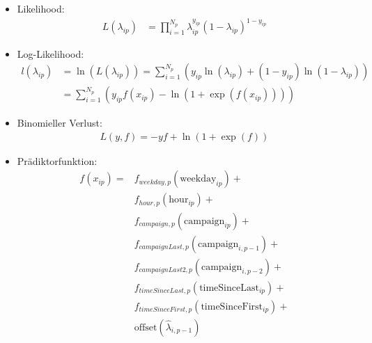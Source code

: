 \begin{frame}
	\begin{itemize}
		\item Likelihood: 
			\begin{align*}
				L(\lambda_{ip}) &= \prod_{i=1}^{N_p} \lambda_{ip}^{y_{ip}} (1-\lambda_{ip})^{1-y_{ip}}
			\end{align*}
		\item Log-Likelihood: 
			\begin{align*}
				l(\lambda_{ip}) &= \ln(L(\lambda_{ip})) = \sum_{i=1}^{N_p} (y_{ip} \ln(\lambda_{ip}) + (1-y_{ip}) \ln(1-\lambda_{ip}))\\
				&= \sum_{i=1}^{N_p} (y_{ip} f(x_{ip}) - \ln(1+\exp(f(x_{ip}))))
			\end{align*}
		\item Binomieller Verlust: 
			\begin{align*}
				L(y,f) = -yf + \ln(1+\exp(f))
			\end{align*}
	\end{itemize}
\end{frame}

\begin{frame}
	\begin{itemize}
		\item Prädiktorfunktion:
			\begin{align*}
			f(x_{ip}) =&f_{weekday,p}(\text{weekday}_{ip}) +\\
								 &f_{hour,p}(\text{hour}_{ip}) +\\
								 &f_{campaign,p}(\text{campaign}_{ip}) +\\
								 &f_{campaignLast,p}(\text{campaign}_{i,p-1}) +\\
								 &f_{campaignLast2,p}(\text{campaign}_{i,p-2}) +\\
								 &f_{timeSinceLast,p}(\text{timeSinceLast}_{ip}) +\\
								 &f_{timeSinceFirst,p}(\text{timeSinceFirst}_{ip}) +\\
								 &\text{offset}(\hat{\lambda}_{i,p-1})
			\end{align*}
	\end{itemize}
\end{frame}

